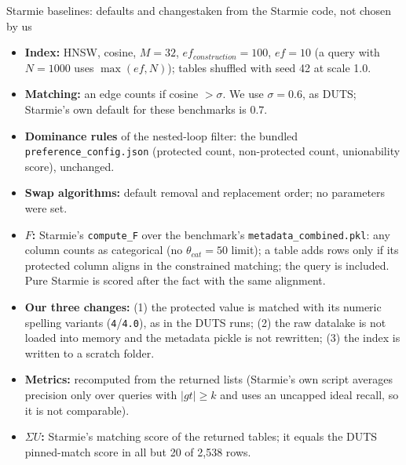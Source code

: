 \documentclass[aspectratio=169,10pt]{beamer}
\newcommand{\highlight}[1]{{\color{Cat1}\bfseries #1}}
\begin{document}
\begin{frame}{Starmie baselines: defaults and changes}{taken from the Starmie code, not chosen by us}
\small
\begin{itemize}\setlength\itemsep{3pt}\footnotesize
\item \highlight{Index:} HNSW, cosine, $M{=}32$, $ef_{construction}{=}100$, $ef{=}10$ (a query with $N{=}1000$ uses $\max(ef,N)$); tables shuffled with seed 42 at scale 1.0.
\item \highlight{Matching:} an edge counts if cosine $>\sigma$. We use $\sigma{=}0.6$, as DUTS; Starmie's own default for these benchmarks is $0.7$.
\item \highlight{Dominance rules} of the nested-loop filter: the bundled \texttt{preference\_config.json} (protected count, non-protected count, unionability score), unchanged.
\item \highlight{Swap algorithms:} default removal and replacement order; no parameters were set.
\item \highlight{$F$:} Starmie's \texttt{compute\_F} over the benchmark's \texttt{metadata\_combined.pkl}: any column counts as categorical (no $\theta_{cat}{=}50$ limit); a table adds rows only if its protected column aligns in the constrained matching; the query is included. Pure Starmie is scored after the fact with the same alignment.
\item \highlight{Our three changes:} (1) the protected value is matched with its numeric spelling variants (\texttt{4}/\texttt{4.0}), as in the DUTS runs; (2) the raw datalake is not loaded into memory and the metadata pickle is not rewritten; (3) the index is written to a scratch folder.
\item \highlight{Metrics:} recomputed from the returned lists (Starmie's own script averages precision only over queries with $|gt|\ge k$ and uses an uncapped ideal recall, so it is not comparable).
\item \highlight{$\Sigma U$:} Starmie's matching score of the returned tables; it equals the DUTS pinned-match score in all but 20 of 2{,}538 rows.
\end{itemize}
\end{frame}
\end{document}
